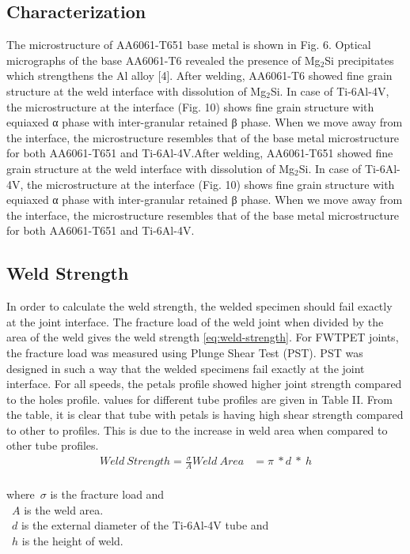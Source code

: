 \documentclass[3p]{elsarticle}
\begin{document}
\subsection{Characterization}
\label{subsec:results-characterization}
The microstructure of AA6061-T651 base metal is shown in Fig. 6. Optical micrographs of the base AA6061-T6 revealed the presence of Mg$_{2}$Si precipitates which strengthens the Al
alloy [4]. After welding, AA6061-T6 showed fine grain structure at the weld interface with dissolution of Mg$_{2}$Si. In case of Ti-6Al-4V, the microstructure at the interface (Fig. 10) shows fine grain structure with equiaxed α phase with inter-granular retained β phase. When we move away from the interface, the
microstructure resembles that of the base metal microstructure for both AA6061-T651 and Ti-6Al-4V.After welding, AA6061-T651 showed fine grain structure at the weld interface with dissolution of Mg$_{2}$Si. In case of Ti-6Al-4V, the microstructure at the interface (Fig. 10) shows fine grain structure with equiaxed α phase with inter-granular retained β phase. When we move away from the interface, the microstructure resembles that of the base metal microstructure for both AA6061-T651 and Ti-6Al-4V.

\subsection{Weld Strength}
\label{subsec:Weld Strength}
In order to calculate the weld strength, the welded specimen should fail exactly at the joint interface. The fracture load of the weld joint when divided by the area of the weld gives the weld strength \ref{eq:weld-strength}. For FWTPET joints, the fracture load was measured using Plunge Shear Test (PST). PST was designed in such a way that the welded specimens fail exactly at the joint interface. For all speeds, the petals profile showed higher joint strength compared to the holes profile.  values for different tube profiles are given in Table II. From the table, it is clear that tube with petals is having high shear strength compared to other to profiles. This is due to the increase in weld area when compared to other tube profiles.
\begin{gather} \label{eq:weld-strength}
Weld\:Strength = \frac{\sigma}{A}
Weld\:Area &= \pi \: * d \: * \: h \\
\end{gather}

where~$\sigma$ is the fracture load and \\
~$A$ is the weld area. \\
~$d$ is the external diameter of the Ti-6Al-4V tube and \\
~$h$ is the height of weld.
\end{document}

